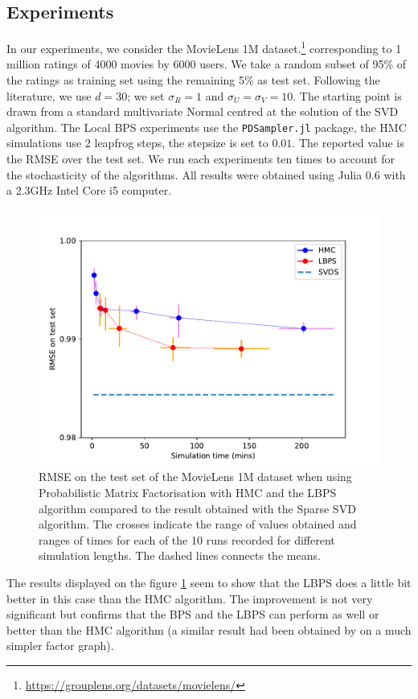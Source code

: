 \subsection{Experiments}

In our experiments, we consider the MovieLens 1M dataset.\footnote{\url{https://grouplens.org/datasets/movielens/}} corresponding to 1 million ratings of 4000 movies by 6000 users. We take a random subset of 95\% of the ratings as training set using the remaining 5\% as test set. 
Following the literature, we use $d=30$; we set $\sigma_{R}=1$ and $\sigma_{U}=\sigma_{V}=10$. The starting point is drawn from a standard multivariate Normal centred at the solution of the SVD algorithm. The Local BPS experiments use the \texttt{PDSampler.jl} package, the HMC simulations use 2 leapfrog steps, the stepsize is set to $0.01$. The reported value is the RMSE over the test set. We run each experiments ten times to account for the stochasticity of the algorithms. All results were obtained using Julia 0.6 with a 2.3GHz Intel Core i5 computer. 

\newpage
\begin{figure}
	\center
	\includegraphics[width=.8\textwidth]{figures/lbp/curves}
	\caption{\label{fig:LBPSvHMC}RMSE on the test set of the MovieLens 1M dataset when using Probabilistic Matrix Factorisation with HMC and the LBPS algorithm compared to the result obtained with the Sparse SVD algorithm. The crosses indicate the range of values obtained and ranges of times for each of the 10 runs recorded for different simulation lengths. The dashed lines connects the means.}
\end{figure}

The results displayed on the figure \ref{fig:LBPSvHMC} seem to show that the LBPS does a little bit better in this case than the HMC algorithm. The improvement is not very significant but confirms that the BPS and the LBPS can perform as well or better than the HMC algorithm (a similar result had been obtained by \citep{bouchard15} on a much simpler factor graph). 

